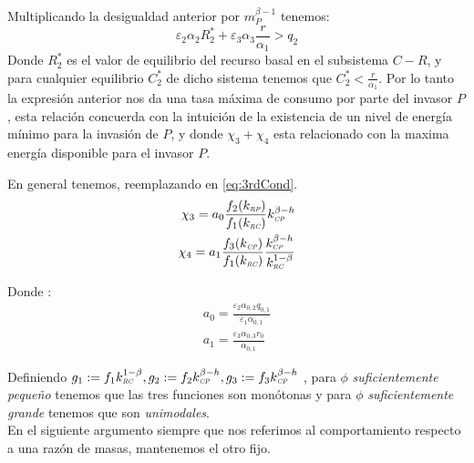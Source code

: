 Multiplicando la desigualdad anterior por $m_P^{\beta - 1}$ tenemos:
\begin{equation}
 \varepsilon_2 \alpha_2 R_2^* + \varepsilon_3 \alpha_3 \frac{r}{\alpha_1} > q_2
\end{equation}
Donde $R_2^*$ es el valor de equilibrio del recurso basal en el subsistema $C-R$, y para cualquier equilibrio $C_2^*$ de dicho sistema tenemos que $C_2^* < \frac{r}{\alpha_1}$. Por lo tanto la expresi\'on anterior nos da una tasa m\'axima de consumo por parte del invasor $P$, esta relaci\'on concuerda con la intuici\'on de la existencia de un nivel de energ\'ia m\'inimo para la invasi\'on de $P$, y donde $\chi_3 + \chi_4$ esta relacionado con la maxima energ\'ia disponible para el invasor $P$.

En general tenemos, reemplazando en \eqref{eq:3rdCond}.
\begin{equation}
  \begin{aligned}
    \chi_3 = a_0 \frac{f_2(k_{\textit{\tiny RP}})}{f_1(k_{\textit{\tiny RC}})} k_{\textit{\tiny CP}}^{\beta-h} \\
    \chi_4 = a_1 \frac{f_3(k_{\textit{\tiny CP}})}{f_1(k_{\textit{\tiny RC}})} \frac{k_{\textit{\tiny CP}}^{\beta - h}}{k_{\textit{\tiny RC}}^{1-\beta}}
  \end{aligned}
\end{equation}

Donde :
\begin{equation}
  \begin{aligned}
    a_0 = \frac{\varepsilon_2 \alpha_{0,2} q_{0,1}}{\varepsilon_1 \alpha_{0,1}} \\
    a_1 = \frac{\varepsilon_3 \alpha_{0,3} r_0}{\alpha_{0,1}}
  \end{aligned}
\end{equation}


Definiendo $g_1:= f_1 k_{\textit{\tiny RC}}^{1-\beta}, g_2:= f_2 k_{\textit{\tiny CP}}^{\beta- h} , g_3 := f_3 k_{\textit{\tiny CP}}^{\beta-h} $ , para $\phi$ \emph{suficientemente peque\~no} tenemos que las tres funciones son mon\'otonas y para $\phi$ \emph{suficientemente grande} tenemos que son \emph{unimodales}.\\

En el siguiente argumento siempre que nos referimos al comportamiento respecto a una raz\'on de masas, mantenemos el otro fijo.\\

